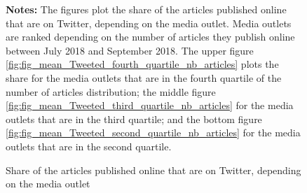 \begin{figure}
\begin{center}
\end{center}
	\begin{spacing}{0.5}
		{\footnotesize \textbf{Notes:} The figures plot the share of the articles published online that are on Twitter, depending on the media outlet. Media outlets are ranked depending on the number of articles they publish online between July 2018 and September 2018. The upper figure \ref{fig:fig_mean_Tweeted_fourth_quartile_nb_articles} plots the share for the media outlets that are in the fourth quartile of the number of articles distribution; the middle figure \ref{fig:fig_mean_Tweeted_third_quartile_nb_articles} for the media outlets that are in the third quartile; and the bottom figure \ref{fig:fig_mean_Tweeted_second_quartile_nb_articles} for the media outlets that are in the second quartile.}
	\end{spacing}
\vspace{.5cm}	
	\caption{Share of the articles published online that are on Twitter, depending on the media outlet}
	\label{fig:fig_mean_Tweeted}
\end{figure}


